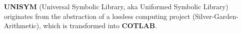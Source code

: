 

\textbf{UNISYM} (Universal Symbolic Library, aka Uniformed Symbolic Library) originates from the abstraction of a lossless computing project (Silver-Garden-Arithmetic), which is transformed into \textbf{COTLAB}.

